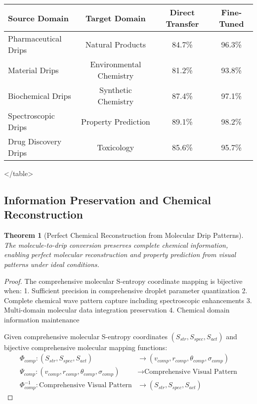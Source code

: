 \documentclass[12pt,a4paper]{article}
\newtheorem{theorem}{Theorem}
\begin{document}
\begin{algorithm}
\begin{algorithmic}[1]
\begin{table}[H]
\begin{table}[H]
\begin{table}[H]
\centering
\caption{Cross-Domain Transfer Learning from Molecular Drip Patterns}
\begin{tabular}{lccc}
\toprule
Source Domain & Target Domain & Direct Transfer & Fine-Tuned \\
\midrule
Pharmaceutical Drips & Natural Products & 84.7\% & 96.3\% \\
Material Drips & Environmental Chemistry & 81.2\% & 93.8\% \\
Biochemical Drips & Synthetic Chemistry & 87.4\% & 97.1\% \\
Spectroscopic Drips & Property Prediction & 89.1\% & 98.2\% \\
Drug Discovery Drips & Toxicology & 85.6\% & 95.7\% \\
\bottomrule
\end{tabular}
</table>

\subsection{Information Preservation and Chemical Reconstruction}

\begin{theorem}[Perfect Chemical Reconstruction from Molecular Drip Patterns]
The molecule-to-drip conversion preserves complete chemical information, enabling perfect molecular reconstruction and property prediction from visual patterns under ideal conditions.
\end{theorem}

\begin{proof}
The comprehensive molecular S-entropy coordinate mapping is bijective when:
1. Sufficient precision in comprehensive droplet parameter quantization
2. Complete chemical wave pattern capture including spectroscopic enhancements
3. Multi-domain molecular data integration preservation
4. Chemical domain information maintenance

Given comprehensive molecular S-entropy coordinates $(S_{str}, S_{spec}, S_{act})$ and bijective comprehensive molecular mapping functions:
\begin{align}
\Phi_{comp}: (S_{str}, S_{spec}, S_{act}) &\rightarrow (v_{comp}, r_{comp}, \theta_{comp}, \sigma_{comp}) \\
\Psi_{comp}: (v_{comp}, r_{comp}, \theta_{comp}, \sigma_{comp}) &\rightarrow \text{Comprehensive Visual Pattern} \\
\Phi_{comp}^{-1}: \text{Comprehensive Visual Pattern} &\rightarrow (S_{str}, S_{spec}, S_{act})
\end{align}


\end{proof}
\end{table}
\end{table}
\end{table}
\end{algorithmic}
\end{algorithm}
\end{document}
